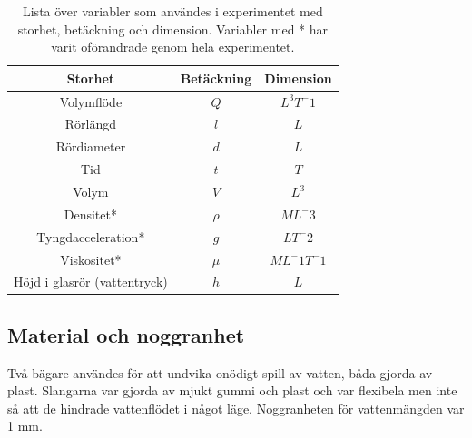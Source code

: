 \documentclass[a4paper,12pt]{article}
\begin{document}
\begin{table}
    \centering
    \begin{tabular}{|c|c|c|}
        \hline
            \textbf{Storhet} & \textbf{Betäckning} & \textbf{Dimension}\\ \hline
            Volymflöde & $Q$ & $L^3T^-1$\\ \hline
            Rörlängd & $l$ & $L$\\ \hline
            Rördiameter & $d$ & $L$\\ \hline
            Tid & $t$ & $T$\\ \hline
            Volym & $V$ & $L^3$\\ \hline
            Densitet* & $\rho$ & $ML^-3$\\ \hline
            Tyngdacceleration* & $g$ & $LT^-2$\\ \hline
            Viskositet* & $\mu$ & $ML^-1T^-1$\\ \hline
            Höjd i glasrör (vattentryck) & $h$ & $L$\\ \hline
    \end{tabular}
    \caption{Lista över variabler som användes i experimentet med storhet, betäckning och dimension. Variabler med * har varit oförandrade genom hela experimentet.}
    \label{tab:Variabellista}
\end{table}
\subsection{Material och noggranhet}
    Två bägare användes för att undvika onödigt spill av vatten, båda gjorda av plast. Slangarna var gjorda av mjukt gummi och plast och var flexibela men inte så att de hindrade vattenflödet i något läge. Noggranheten för vattenmängden var 1 mm.
%
\end{document}
